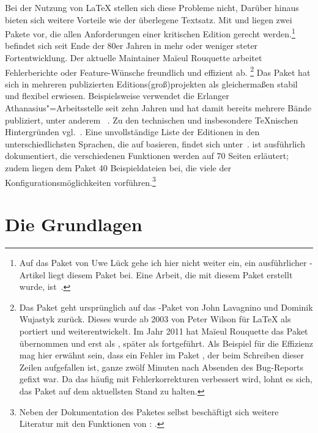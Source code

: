 Bei der Nutzung von \LaTeX{} stellen sich diese Probleme nicht, Darüber hinaus bieten sich 
weitere Vorteile wie der überlegene Textsatz. Mit  und \reledmac 
liegen zwei Pakete vor, die allen Anforderungen einer kritischen Edition gerecht 
werden.\footnote{Auf das Paket  von Uwe Lück gehe ich 
hier nicht weiter ein, ein ausführlicher \TUGboat-Artikel liegt diesem Paket bei. 
Eine Arbeit, die mit diesem Paket erstellt wurde, ist~\cite{mariev:joh_ant}.} 
\reledmac befindet sich seit Ende der 80er Jahren in mehr oder weniger steter Fortentwicklung. 
Der aktuelle Maintainer Maïeul Rouquette arbeitet Fehlerberichte oder Feature-Wünsche 
freundlich und effizient ab.%
\footnote{%
	Das Paket \reledmac geht 
	ursprünglich auf das \plainTeX{}-Paket  von John Lavagnino und 
	Dominik Wujastyk zurück. Dieses wurde ab 2003 von Peter Wilson für \LaTeX{} 
	als  portiert und weiterentwickelt. Im Jahr 2011 hat Maïeul 
	Rouquette das Paket übernommen und erst als , später als \reledmac fortgeführt. 
	Als Beispiel für die Effizienz mag hier erwähnt sein, dass ein Fehler im Paket 
	\reledmac, der beim Schreiben dieser Zeilen aufgefallen ist, ganze zwölf Minuten nach 
	Absenden des Bug-Reports gefixt war.
	Da das \reledmac häufig mit Fehlerkorrekturen verbessert wird, lohnt es sich, das Paket auf dem aktuellsten Stand zu halten.}
Das Paket hat sich in mehreren publizierten 
Editions(groß)projekten als gleichermaßen stabil und flexibel erwiesen. %
Beispielsweise verwendet die Erlanger Athanasius"=Arbeitsstelle %
seit zehn Jahren 
 und hat damit bereits mehrere Bände publiziert, unter anderem%
~\cite{athanasius_3_1_4}. Zu den technischen und insbesondere \TeX{}nischen 
Hintergründen vgl.~\cite{stockhausen:mde2016/2}. Eine unvollständige Liste der Editionen in den unterschiedlichsten 
Sprachen, die auf  basieren, findet sich unter~\cite{reledmac-benutzung}. 
\reledmac ist 
ausführlich dokumentiert, die verschiedenen Funktionen werden auf 70 Seiten 
erläutert; zudem liegen dem Paket 40 Beispieldateien bei, die viele der 
Konfigurationsmöglichkeiten vorführen.\footnote{Neben der Dokumentation des Paketes selbst beschäftigt sich weitere Literatur mit den Funktionen von : \cite{reledmac-literatur}.}


\section{Die Grundlagen}\label{apparate-grundlagen-anfang}

